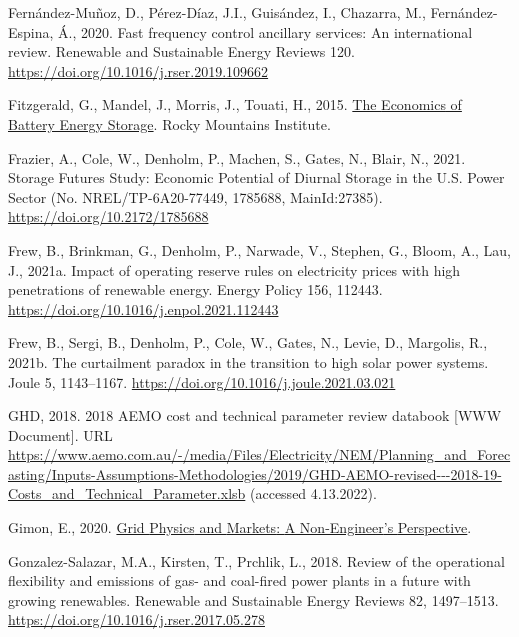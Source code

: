 \documentclass[12pt,a4paper,]{report}
\newlength{\cslhangindent}
\newenvironment{CSLReferences}[2] %
 {%
  \setlength{\parindent}{0pt}
  \ifodd #1 \everypar{\setlength{\hangindent}{\cslhangindent}}\ignorespaces\fi
  \ifnum #2 > 0
  \setlength{\parskip}{#2\baselineskip}
  \fi
 }%
 {}
\begin{document}
\begin{CSLReferences}{1}{0}
\leavevmode{}%
Fernández-Muñoz, D., Pérez-Díaz, J.I., Guisández, I., Chazarra, M.,
Fernández-Espina, Á., 2020. Fast frequency control ancillary services:
{An} international review. Renewable and Sustainable Energy Reviews 120.
\url{https://doi.org/10.1016/j.rser.2019.109662}

\leavevmode{}%
Fitzgerald, G., Mandel, J., Morris, J., Touati, H., 2015.
\href{https://rmi.org/insight/economics-battery-energy-storage/}{The
{Economics} of {Battery Energy Storage}}. {Rocky Mountains Institute}.

\leavevmode{}%
Frazier, A., Cole, W., Denholm, P., Machen, S., Gates, N., Blair, N.,
2021. Storage {Futures Study}: {Economic Potential} of {Diurnal Storage}
in the {U}.{S}. {Power Sector} (No. NREL/TP-6A20-77449, 1785688,
MainId:27385). \url{https://doi.org/10.2172/1785688}

\leavevmode{}%
Frew, B., Brinkman, G., Denholm, P., Narwade, V., Stephen, G., Bloom,
A., Lau, J., 2021a. Impact of operating reserve rules on electricity
prices with high penetrations of renewable energy. Energy Policy 156,
112443. \url{https://doi.org/10.1016/j.enpol.2021.112443}

\leavevmode{}%
Frew, B., Sergi, B., Denholm, P., Cole, W., Gates, N., Levie, D.,
Margolis, R., 2021b. The curtailment paradox in the transition to high
solar power systems. Joule 5, 1143--1167.
\url{https://doi.org/10.1016/j.joule.2021.03.021}

\leavevmode{}%
GHD, 2018. 2018 {AEMO} cost and technical parameter review databook
{[}WWW Document{]}. URL
\url{https://www.aemo.com.au/-/media/Files/Electricity/NEM/Planning_and_Forecasting/Inputs-Assumptions-Methodologies/2019/GHD-AEMO-revised---2018-19-Costs_and_Technical_Parameter.xlsb}
(accessed 4.13.2022).

\leavevmode{}%
Gimon, E., 2020.
\href{https://www.esig.energy/download/plenary-1-grid-physics-and-markets-a-non-engineers-perspective-eric-gimon/}{Grid
{Physics} and {Markets}: {A Non-Engineer}'s {Perspective}}.

\leavevmode{}%
Gonzalez-Salazar, M.A., Kirsten, T., Prchlik, L., 2018. Review of the
operational flexibility and emissions of gas- and coal-fired power
plants in a future with growing renewables. Renewable and Sustainable
Energy Reviews 82, 1497--1513.
\url{https://doi.org/10.1016/j.rser.2017.05.278}


\end{CSLReferences}
\end{document}
